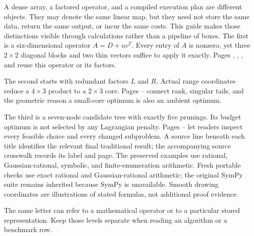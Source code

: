 A dense array, a factored operator, and a compiled execution plan are different objects. They may denote the same linear map, but they need not store the same data, return the same output, or incur the same costs. This guide makes those distinctions visible through calculations rather than a pipeline of boxes.
The first is a six-dimensional operator $A=D+uv^T$. Every entry of $A$ is nonzero, yet three $2\times2$ diagonal blocks and two thin vectors suffice to apply it exactly. Pages , , , and  reuse this operator or its factors.

The second starts with redundant factors $L$ and $R$. Actual range coordinates reduce a $4\times3$ product to a $2\times3$ core. Pages -- connect rank, singular tails, and the geometric reason a small-core optimum is also an ambient optimum.

The third is a seven-node candidate tree with exactly five prunings. Its budget optimum is not selected by any Lagrangian penalty. Pages -- let readers inspect every feasible choice and every changed subproblem.
A source line beneath each title identifies the relevant final traditional result; the accompanying source crosswalk records its label and page. The preserved examples use rational, Gaussian-rational, symbolic, and finite-enumeration arithmetic. Fresh portable checks use exact rational and Gaussian-rational arithmetic; the original SymPy suite remains inherited because SymPy is unavailable. Smooth drawing coordinates are illustrations of stated formulas, not additional proof evidence.

The same letter can refer to a mathematical operator or to a particular stored representation. Keep those levels separate when reading an algorithm or a benchmark row.

